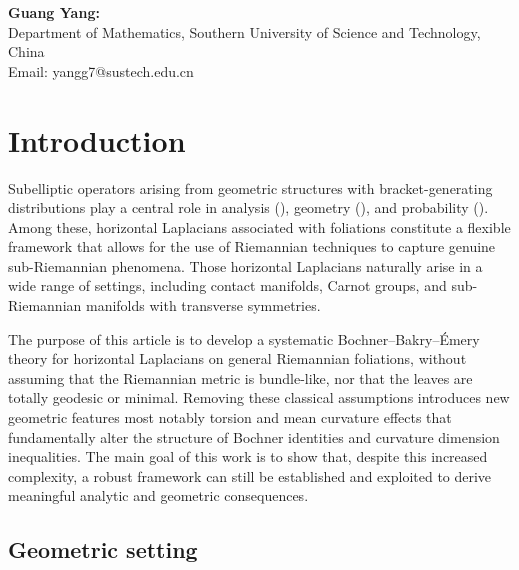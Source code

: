 \documentclass[11pt]{article}
\numberwithin{equation}{section}
\begin{document}
\vspace{10pt}

\noindent
\begin{minipage}{\textwidth}
    \small
    \textbf{Guang Yang:} \\
    Department of Mathematics, Southern University of Science and Technology, China \\
    Email: yangg7@sustech.edu.cn
\end{minipage}
	
	\newpage
	

    \section{Introduction}

Subelliptic operators arising from geometric structures with bracket-generating distributions play a central role in analysis (\cite{JerisonSanchezCalle1987,NagelSteinWainger1985}), geometry (\cite{AgrachevBarilariBoscain2019}), and probability (\cite{Thalmaier-lectures}). Among these, horizontal Laplacians associated with foliations constitute a flexible framework that allows for the use of Riemannian techniques to capture genuine sub-Riemannian phenomena. Those horizontal Laplacians naturally arise in a wide range of settings, including contact  manifolds, Carnot groups, and sub-Riemannian manifolds with transverse symmetries.

The purpose of this article is to develop a systematic Bochner–Bakry–Émery theory for horizontal Laplacians on general Riemannian foliations, without assuming that the Riemannian metric is bundle-like, nor that the leaves are totally geodesic or minimal. Removing these classical assumptions introduces new geometric features most notably torsion and mean curvature effects that fundamentally alter the structure of Bochner identities and curvature dimension inequalities. The main goal of this work is to show that, despite this increased complexity, a robust  framework can still be established and exploited to derive meaningful analytic and geometric consequences.

\subsection{Geometric setting}
\end{document}
